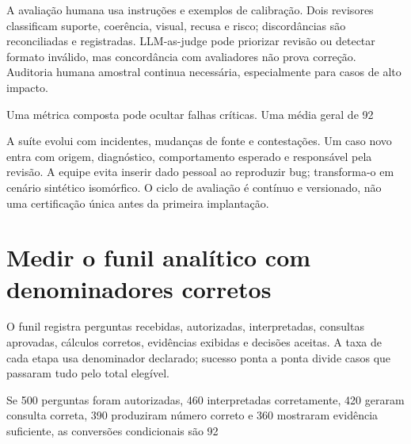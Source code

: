 A avaliação humana usa instruções e exemplos de calibração. Dois revisores classificam suporte, coerência, visual, recusa e risco; discordâncias são reconciliadas e registradas. LLM-as-judge pode priorizar revisão ou detectar formato inválido, mas concordância com avaliadores não prova correção. Auditoria humana amostral continua necessária, especialmente para casos de alto impacto.

Uma métrica composta pode ocultar falhas críticas. Uma média geral de 92%

A suíte evolui com incidentes, mudanças de fonte e contestações. Um caso novo entra com origem, diagnóstico, comportamento esperado e responsável pela revisão. A equipe evita inserir dado pessoal ao reproduzir bug; transforma-o em cenário sintético isomórfico. O ciclo de avaliação é contínuo e versionado, não uma certificação única antes da primeira implantação.

\section{Medir o funil analítico com denominadores corretos}

O funil registra perguntas recebidas, autorizadas, interpretadas, consultas aprovadas, cálculos corretos, evidências exibidas e decisões aceitas. A taxa de cada etapa usa denominador declarado; sucesso ponta a ponta divide casos que passaram tudo pelo total elegível.

Se 500 perguntas foram autorizadas, 460 interpretadas corretamente, 420 geraram consulta correta, 390 produziram número correto e 360 mostraram evidência suficiente, as conversões condicionais são 92%

